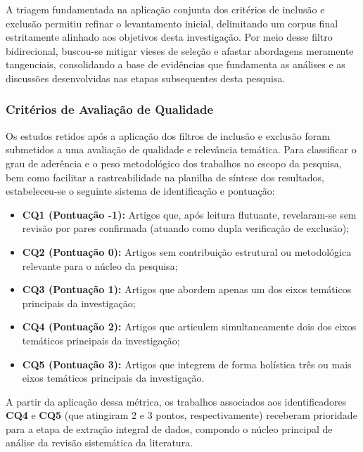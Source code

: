 \documentclass[
	12pt,				%
	oneside,			%
	a4paper,			%
	english,			%
	brazil				%
	]{abntex2ppgsi}
\begin{document}
    A triagem fundamentada na aplicação conjunta dos critérios de inclusão e exclusão permitiu refinar o levantamento inicial, delimitando um corpus final estritamente alinhado aos objetivos desta investigação. Por meio desse filtro bidirecional, buscou-se mitigar vieses de seleção e afastar abordagens meramente tangenciais, consolidando a base de evidências que fundamenta as análises e as discussões desenvolvidas nas etapas subsequentes desta pesquisa.


  \subsubsection{Critérios de Avaliação de Qualidade}
\label{crit:quali}

    Os estudos retidos após a aplicação dos filtros de inclusão e exclusão foram submetidos a uma avaliação de qualidade e relevância temática. Para classificar o grau de aderência e o peso metodológico dos trabalhos no escopo da pesquisa, bem como facilitar a rastreabilidade na planilha de síntese dos resultados, estabeleceu-se o seguinte sistema de identificação e pontuação:

\begin{itemize}
    \item[] \textbf{CQ1 (Pontuação -1):} Artigos que, após leitura flutuante, revelaram-se sem revisão por pares confirmada (atuando como dupla verificação de exclusão);
    \item[] \textbf{CQ2 (Pontuação 0):} Artigos sem contribuição estrutural ou metodológica relevante para o núcleo da pesquisa;
    \item[] \textbf{CQ3 (Pontuação 1):} Artigos que abordem apenas um dos eixos temáticos principais da investigação;
    \item[] \textbf{CQ4 (Pontuação 2):} Artigos que articulem simultaneamente dois dos eixos temáticos principais da investigação;
    \item[] \textbf{CQ5 (Pontuação 3):} Artigos que integrem de forma holística três ou mais eixos temáticos principais da investigação.
\end{itemize}

    A partir da aplicação dessa métrica, os trabalhos associados aos identificadores \textbf{CQ4} e \textbf{CQ5} (que atingiram 2 e 3 pontos, respectivamente) receberam prioridade para a etapa de extração integral de dados, compondo o núcleo principal de análise da revisão sistemática da literatura.
   
\end{document}
